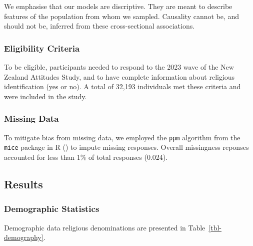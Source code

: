 \documentclass[
  single column]{article}
\begin{document}
We emphasise that our models are discriptive. They are meant to describe
features of the population from whom we sampled. Causality cannot be,
and should not be, inferred from these cross-sectional associations.

\subsubsection{Eligibility Criteria}\label{eligibility-criteria}

To be eligible, participants needed to respond to the 2023 wave of the
New Zealand Attitudes Study, and to have complete information about
religious identification (yes or no). A total of 32,193 individuals met
these criteria and were included in the study.

\subsubsection{Missing Data}\label{missing-data}

To mitigate bias from missing data, we employed the \texttt{ppm}
algorithm from the \texttt{mice} package in R
() to impute missing
responses. Overall missingness reponses accounted for less than 1\% of
total responses (0.024).

\subsection{Results}\label{results}

\subsubsection{Demographic Statistics}\label{demographic-statistics}

Demographic data religious denominations are presented in
Table~\ref{tbl-demography}.
\end{document}
